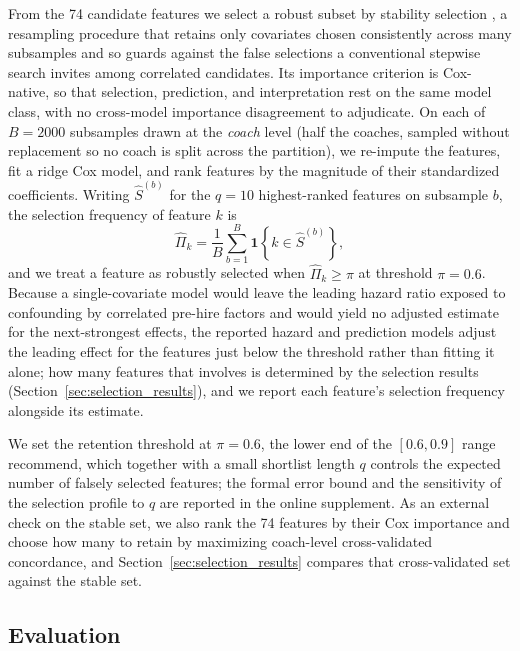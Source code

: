 \documentclass[12pt,USenglish]{article}
\begin{document}
From the 74 candidate features we select a robust subset by stability selection \citep{meinshausen2010}, a resampling procedure that retains only covariates chosen consistently across many subsamples and so guards against the false selections a conventional stepwise search invites among correlated candidates. Its importance criterion is Cox-native, so that selection, prediction, and interpretation rest on the same model class, with no cross-model importance disagreement to adjudicate. On each of $B = 2000$ subsamples drawn at the \emph{coach} level (half the coaches, sampled without replacement so no coach is split across the partition), we re-impute the features, fit a ridge Cox model, and rank features by the magnitude of their standardized coefficients. Writing $\hat{S}^{(b)}$ for the $q = 10$ highest-ranked features on subsample $b$, the selection frequency of feature $k$ is
\begin{equation}
\hat{\Pi}_k = \frac{1}{B}\sum_{b=1}^{B} \mathbf{1}\!\left\{k \in \hat{S}^{(b)}\right\},
\label{eq:stability}
\end{equation}
and we treat a feature as robustly selected when $\hat{\Pi}_k \geq \pi$ at threshold $\pi = 0.6$. Because a single-covariate model would leave the leading hazard ratio exposed to confounding by correlated pre-hire factors and would yield no adjusted estimate for the next-strongest effects, the reported hazard and prediction models adjust the leading effect for the features just below the threshold rather than fitting it alone; how many features that involves is determined by the selection results (Section~\ref{sec:selection_results}), and we report each feature's selection frequency alongside its estimate.

We set the retention threshold at $\pi = 0.6$, the lower end of the $[0.6, 0.9]$ range \citet{meinshausen2010} recommend, which together with a small shortlist length $q$ controls the expected number of falsely selected features; the formal error bound and the sensitivity of the selection profile to $q$ are reported in the online supplement. As an external check on the stable set, we also rank the 74 features by their Cox importance and choose how many to retain by maximizing coach-level cross-validated concordance, and Section~\ref{sec:selection_results} compares that cross-validated set against the stable set.

\subsection{Evaluation}
\label{sec:eval}
\end{document}
